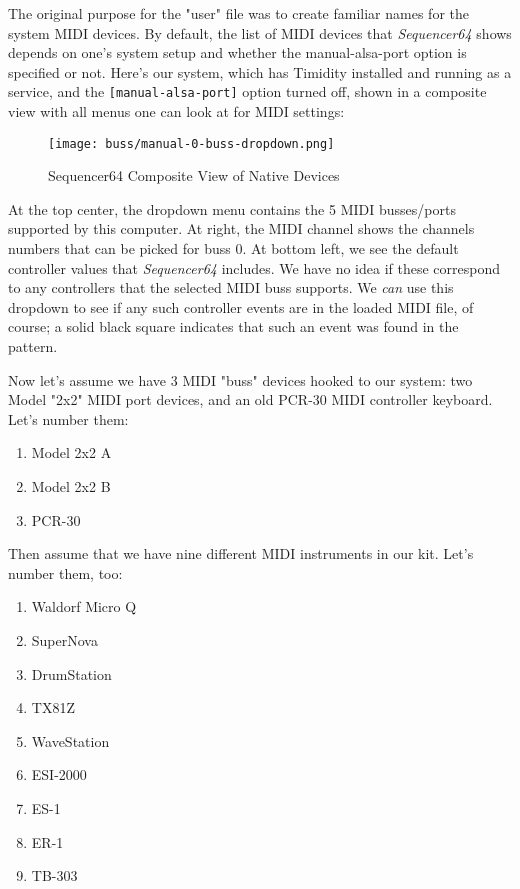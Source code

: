    The original purpose for the "user" file was to create familiar names for the
   system MIDI devices.
   By default, the list of MIDI devices that \textsl{Sequencer64} shows depends
   on one's system setup and whether the manual-alsa-port option is specified
   or not.  Here's our system, which has Timidity installed and running as a
   service, and the \texttt{[manual-alsa-port]} option turned off, shown in a
   composite view with all menus one can look at for MIDI settings:

\begin{figure}[H]
   \centering 
   \texttt{[image: buss/manual-0-buss-dropdown.png]}
   \caption{Sequencer64 Composite View of Native Devices}
   \label{fig:seq64_manual_0_buss_dropdown}
\end{figure}

   At the top center, the dropdown menu contains the 5 MIDI busses/ports
   supported by this computer.  At right, the MIDI channel shows
   the channels numbers that can be picked for buss 0.  At bottom left, we see
   the default controller values that \textsl{Sequencer64} includes.  We have
   no idea if these correspond to any controllers that the selected MIDI buss
   supports.  We \textsl{can} use this dropdown to see if any such controller
   events are in the loaded MIDI file, of course; a solid black square
   indicates that such an event was found in the pattern.

   Now let's assume we have 3 MIDI "buss" devices hooked to our system:
   two Model "2x2" MIDI port devices, and an old PCR-30 MIDI controller
   keyboard.  Let's number them:

   \begin{enumerate}
      \item Model 2x2 A
      \item Model 2x2 B
      \item PCR-30
   \end{enumerate}

   Then assume that we have nine different MIDI instruments in our kit.
   Let's number them, too:

   \begin{enumerate}
      \item Waldorf Micro Q
      \item SuperNova
      \item DrumStation
      \item TX81Z
      \item WaveStation
      \item ESI-2000
      \item ES-1
      \item ER-1
      \item TB-303
   \end{enumerate}

